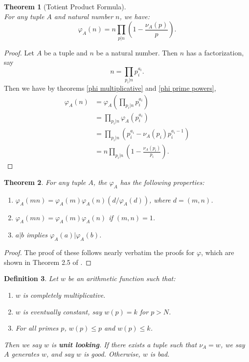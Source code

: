 \documentclass[11pt, leqno]{article}
\newtheorem{theorem}{Theorem}[section]
\newtheorem{definition}[theorem]{Definition}
\begin{document}
\begin{theorem}[Totient Product Formula]~ \\
    For any tuple $A$ and natural number $n$, we have:
    $$\varphi_A(n)=n\prod_{p|n}\left(1-\frac{\nu_A(p)}{p}\right).$$
\end{theorem}
\begin{proof}
Let $A$ be a tuple and $n$ be a natural number.
Then $n$ has a factorization, say
$$n=\prod_{p_i|n}p_i^{a_i}.$$
Then we have by theorems \ref{phi multiplicative} and \ref{phi prime powers},
\begin{align*}
    \varphi_A(n) 
    &= \varphi_A\left(\prod_{p_i|n}p_i^{a_i}\right) \\
    &= \prod_{p_i|n}\varphi_A(p_i^{a_i}) \\
    &= \prod_{p_i|n} \left(p_i^{a_i} - \nu_A(p_i)p_i^{a_i-1}\right) \\
    &= n\prod_{p_i|n} \left(1 - \frac{\nu_A(p_i)}{p_i}\right).
\end{align*}
\end{proof}

\begin{theorem}
    For any tuple $A$, the $\varphi_A$ has the following properties:
    \begin{enumerate}
        \item[\textnormal{(a)}] $\varphi_A(mn) = \varphi_A(m)\varphi_A(n)(d/\varphi_A(d))$, where $d=(m,n)$.
        \item[\textnormal{(b)}] $\varphi_A(mn) = \varphi_A(m)\varphi_A(n)$ if $(m,n)=1$.
        \item[\textnormal{(c)}] $a|b$ implies $\varphi_A(a)|\varphi_A(b)$.
    \end{enumerate}
\end{theorem}
\begin{proof}
    The proof of these follows nearly verbatim the proofs for $\varphi$,
    which are shown in Theorem 2.5 of \cite{Apostol}.
\end{proof}

\begin{definition}
    Let $w$ be an arithmetic function such that:
    \begin{enumerate}
        \item $w$ is completely multiplicative.
        \item $w$ is eventually constant, say $w(p)=k$ for $p>N$.
        \item For all primes $p$, $w(p) \le p$ and $w(p) \le k$.
    \end{enumerate}
    Then we say $w$ is \textbf{unit looking}.
    If there exists a tuple such that $\nu_A=w$, we say $A$ generates $w$, and
    say $w$ is good. 
    Otherwise, $w$ is bad.
\end{definition}
\end{document}
